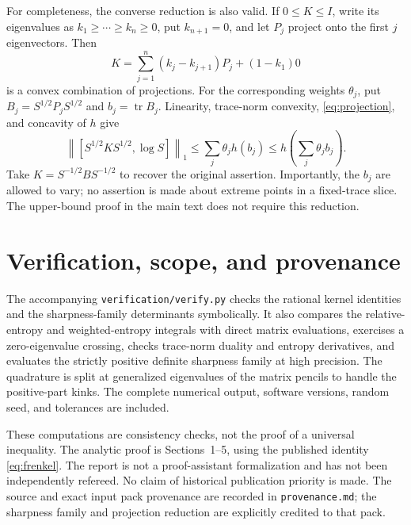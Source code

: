 \documentclass[11pt]{article}
\numberwithin{equation}{section}
\theoremstyle{remark}
\DeclareMathOperator{\tr}{tr}
\newcommand{\Id}{I}
\newcommand{\one}[1]{\left\lVert #1\right\rVert_1}
\begin{document}
For completeness, the converse reduction is also valid. If $0\le K\le\Id$,
write its eigenvalues as $k_1\ge\cdots\ge k_n\ge0$, put $k_{n+1}=0$,
and let $P_j$ project onto the first $j$ eigenvectors. Then
\[
 K=\sum_{j=1}^n(k_j-k_{j+1})P_j+(1-k_1)0
\]
is a convex combination of projections. For the corresponding weights
$\theta_j$, put $B_j=S^{1/2}P_jS^{1/2}$ and $b_j=\tr B_j$.
Linearity, trace-norm convexity, \eqref{eq:projection}, and concavity of
$h$ give
\[
 \one{[S^{1/2}KS^{1/2},\log S]}
 \le\sum_j\theta_j h(b_j)
 \le h\!\left(\sum_j\theta_j b_j\right).
\]
Take $K=S^{-1/2}BS^{-1/2}$ to recover the original assertion.
Importantly, the $b_j$ are allowed to vary; no assertion is made about
extreme points in a fixed-trace slice. The upper-bound proof in the
main text does not require this reduction.

\section{Verification, scope, and provenance}

The accompanying \texttt{verification/verify.py} checks the rational
kernel identities and the sharpness-family determinants symbolically.
It also compares the relative-entropy and weighted-entropy integrals
with direct matrix evaluations, exercises a zero-eigenvalue crossing,
checks trace-norm duality and entropy derivatives, and evaluates the
strictly positive definite sharpness family at high precision. The
quadrature is split at generalized eigenvalues of the matrix pencils
to handle the positive-part kinks. The complete numerical output,
software versions, random seed, and tolerances are included.

These computations are consistency checks, not the proof of a universal
inequality. The analytic proof is Sections~1--5, using the published
identity \eqref{eq:frenkel}. The report is not a proof-assistant
formalization and has not been independently refereed. No claim of
historical publication priority is made. The source and exact input
pack provenance are recorded in \texttt{provenance.md}; the sharpness
family and projection reduction are explicitly credited to that pack.
\end{document}
